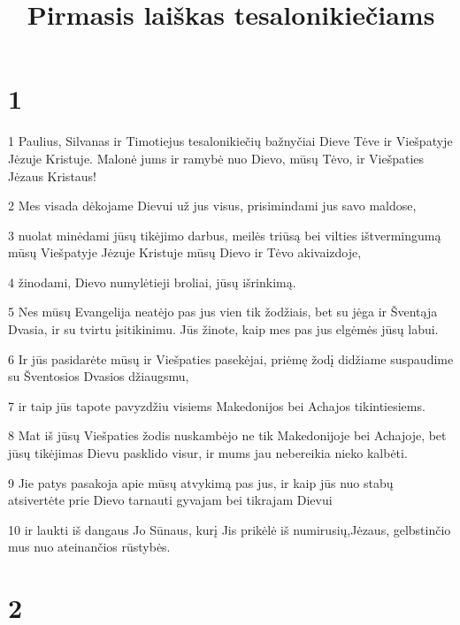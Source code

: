 

\title{Pirmasis laiškas tesalonikiečiams}

\chapter{1}


\par 1 Paulius, Silvanas ir Timotiejus tesalonikiečių bažnyčiai Dieve Tėve ir Viešpatyje Jėzuje Kristuje. Malonė jums ir ramybė nuo Dievo, mūsų Tėvo, ir Viešpaties Jėzaus Kristaus! 
\par 2 Mes visada dėkojame Dievui už jus visus, prisimindami jus savo maldose, 
\par 3 nuolat minėdami jūsų tikėjimo darbus, meilės triūsą bei vilties ištvermingumą mūsų Viešpatyje Jėzuje Kristuje mūsų Dievo ir Tėvo akivaizdoje, 
\par 4 žinodami, Dievo numylėtieji broliai, jūsų išrinkimą. 
\par 5 Nes mūsų Evangelija neatėjo pas jus vien tik žodžiais, bet su jėga ir Šventąja Dvasia, ir su tvirtu įsitikinimu. Jūs žinote, kaip mes pas jus elgėmės jūsų labui. 
\par 6 Ir jūs pasidarėte mūsų ir Viešpaties pasekėjai, priėmę žodį didžiame suspaudime su Šventosios Dvasios džiaugsmu, 
\par 7 ir taip jūs tapote pavyzdžiu visiems Makedonijos bei Achajos tikintiesiems. 
\par 8 Mat iš jūsų Viešpaties žodis nuskambėjo ne tik Makedonijoje bei Achajoje, bet jūsų tikėjimas Dievu pasklido visur, ir mums jau nebereikia nieko kalbėti. 
\par 9 Jie patys pasakoja apie mūsų atvykimą pas jus, ir kaip jūs nuo stabų atsivertėte prie Dievo tarnauti gyvajam bei tikrajam Dievui 
\par 10 ir laukti iš dangaus Jo Sūnaus, kurį Jis prikėlė iš numirusių,­Jėzaus, gelbstinčio mus nuo ateinančios rūstybės.


\chapter{2}


